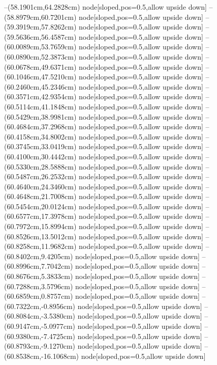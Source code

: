 --(58.1901cm,64.2828cm) node[sloped,pos=0.5,allow upside down]{\arrowIn}
--(58.8979cm,60.7201cm) node[sloped,pos=0.5,allow upside down]{\ArrowIn}
--(59.3919cm,57.8262cm) node[sloped,pos=0.5,allow upside down]{\ArrowIn}
--(59.5636cm,56.4587cm) node[sloped,pos=0.5,allow upside down]{\ArrowIn}
--(60.0089cm,53.7659cm) node[sloped,pos=0.5,allow upside down]{\ArrowIn}
--(60.0890cm,52.3873cm) node[sloped,pos=0.5,allow upside down]{\ArrowIn}
--(60.0678cm,49.6371cm) node[sloped,pos=0.5,allow upside down]{\ArrowIn}
--(60.1046cm,47.5210cm) node[sloped,pos=0.5,allow upside down]{\ArrowIn}
--(60.2460cm,45.2346cm) node[sloped,pos=0.5,allow upside down]{\ArrowIn}
--(60.3571cm,42.9354cm) node[sloped,pos=0.5,allow upside down]{\ArrowIn}
--(60.5114cm,41.1848cm) node[sloped,pos=0.5,allow upside down]{\ArrowIn}
--(60.5429cm,38.9981cm) node[sloped,pos=0.5,allow upside down]{\ArrowIn}
--(60.4684cm,37.2968cm) node[sloped,pos=0.5,allow upside down]{\ArrowIn}
--(60.4158cm,34.8002cm) node[sloped,pos=0.5,allow upside down]{\ArrowIn}
--(60.3745cm,33.0419cm) node[sloped,pos=0.5,allow upside down]{\ArrowIn}
--(60.4100cm,30.4442cm) node[sloped,pos=0.5,allow upside down]{\ArrowIn}
--(60.5330cm,28.5888cm) node[sloped,pos=0.5,allow upside down]{\ArrowIn}
--(60.5487cm,26.2532cm) node[sloped,pos=0.5,allow upside down]{\ArrowIn}
--(60.4640cm,24.3460cm) node[sloped,pos=0.5,allow upside down]{\ArrowIn}
--(60.4648cm,21.7008cm) node[sloped,pos=0.5,allow upside down]{\ArrowIn}
--(60.5454cm,20.0124cm) node[sloped,pos=0.5,allow upside down]{\ArrowIn}
--(60.6577cm,17.3978cm) node[sloped,pos=0.5,allow upside down]{\ArrowIn}
--(60.7972cm,15.8994cm) node[sloped,pos=0.5,allow upside down]{\ArrowIn}
--(60.8526cm,13.5012cm) node[sloped,pos=0.5,allow upside down]{\ArrowIn}
--(60.8258cm,11.9682cm) node[sloped,pos=0.5,allow upside down]{\ArrowIn}
--(60.8402cm,9.4205cm) node[sloped,pos=0.5,allow upside down]{\ArrowIn}
--(60.8996cm,7.7042cm) node[sloped,pos=0.5,allow upside down]{\ArrowIn}
--(60.8676cm,5.3833cm) node[sloped,pos=0.5,allow upside down]{\ArrowIn}
--(60.7288cm,3.5796cm) node[sloped,pos=0.5,allow upside down]{\ArrowIn}
--(60.6859cm,0.8757cm) node[sloped,pos=0.5,allow upside down]{\ArrowIn}
--(60.7322cm,-0.8956cm) node[sloped,pos=0.5,allow upside down]{\ArrowIn}
--(60.8084cm,-3.5380cm) node[sloped,pos=0.5,allow upside down]{\ArrowIn}
--(60.9147cm,-5.0977cm) node[sloped,pos=0.5,allow upside down]{\ArrowIn}
--(60.9380cm,-7.4725cm) node[sloped,pos=0.5,allow upside down]{\ArrowIn}
--(60.8793cm,-9.1270cm) node[sloped,pos=0.5,allow upside down]{\ArrowIn}
--(60.8538cm,-16.1068cm) node[sloped,pos=0.5,allow upside down]{\ArrowIn}
